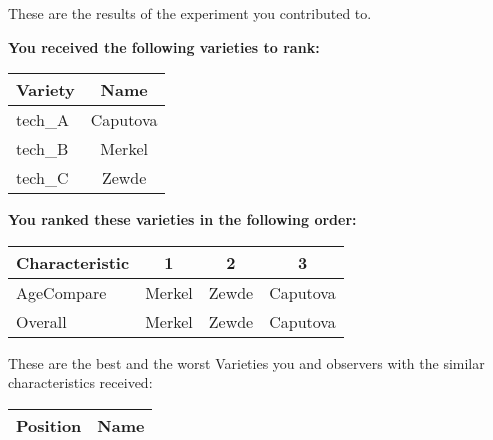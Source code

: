\documentclass[10pt]{article}
\begin{document}
\begin{titlepage}
	These are the results of the experiment you contributed to.

	\begin{flushleft}
		\textbf{You received the following varieties to rank: }\hfill \break
		\begin{tabularx}{\textwidth}{ X | c  }
			\hline
			\textbf{Variety} & \textbf{Name} \\ \hline

			
				tech\_A & Caputova \\ \hline
			
				tech\_B & Merkel \\ \hline
			
				tech\_C & Zewde \\ \hline
			


		\end{tabularx}\newline \newline

		\textbf{You ranked these varieties in the following order: }\hfill \break
		\begin{tabularx}{\textwidth}{ X | c | c | c  }
			\hline
			\textbf{Characteristic}
			
				& \textbf{ 1 }
			
				& \textbf{ 2 }
			
				& \textbf{ 3 }
			
			\\ \hline


			
				AgeCompare & Merkel  & Zewde  & Caputova  \\ \hline


			
				Overall & Merkel  & Zewde  & Caputova  \\ \hline


			

		\end{tabularx}

	\end{flushleft}

	\pagebreak

	\begin{flushleft}
		These are the best and the worst Varieties you and observers with the similar characteristics received:\hfill \break \newline
		\begin{tabularx}{\textwidth}{ X | X  }
			\hline
			\textbf{Position} & \textbf{Name} \\ \hline


\end{tabularx}
\end{flushleft}
\end{titlepage}
\end{document}
